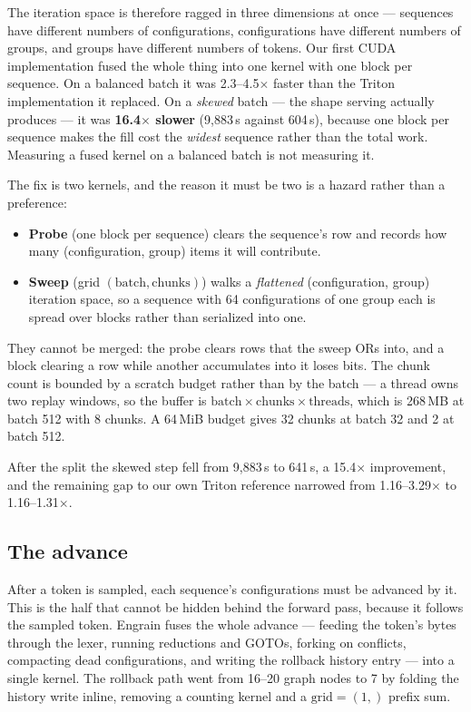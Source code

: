 \documentclass{article}
\begin{document}
The iteration space is therefore ragged in three dimensions at once ---
sequences have different numbers of configurations, configurations have
different numbers of groups, and groups have different numbers of tokens. Our
first CUDA implementation fused the whole thing into one kernel with one block
per sequence. On a balanced batch it was 2.3--4.5$\times$ faster than the Triton
implementation it replaced. On a \emph{skewed} batch --- the shape serving
actually produces --- it was \textbf{16.4$\times$ slower} (9{,}883\,\textmu{}s
against 604\,\textmu{}s), because one block per sequence makes the fill cost the
\emph{widest} sequence rather than the total work. Measuring a fused kernel on a
balanced batch is not measuring it.

The fix is two kernels, and the reason it must be two is a hazard rather than a
preference:

\begin{itemize}
\item \textbf{Probe} (one block per sequence) clears the sequence's row and
records how many (configuration, group) items it will contribute.
\item \textbf{Sweep} (grid $(\text{batch}, \text{chunks})$) walks a
\emph{flattened} (configuration, group) iteration space, so a sequence with 64
configurations of one group each is spread over blocks rather than serialized
into one.
\end{itemize}

They cannot be merged: the probe clears rows that the sweep ORs into, and a
block clearing a row while another accumulates into it loses bits. The chunk
count is bounded by a scratch budget rather than by the batch --- a thread owns
two replay windows, so the buffer is $\text{batch} \times \text{chunks} \times
\text{threads}$, which is 268\,MB at batch 512 with 8 chunks. A 64\,MiB budget
gives 32 chunks at batch 32 and 2 at batch 512.

After the split the skewed step fell from 9{,}883\,\textmu{}s to
641\,\textmu{}s, a 15.4$\times$ improvement, and the remaining gap to our own
Triton reference narrowed from 1.16--3.29$\times$ to 1.16--1.31$\times$.

\subsection{The advance}

After a token is sampled, each sequence's configurations must be advanced by it.
This is the half that cannot be hidden behind the forward pass, because it
follows the sampled token. Engrain fuses the whole advance --- feeding the
token's bytes through the lexer, running reductions and GOTOs, forking on
conflicts, compacting dead configurations, and writing the rollback history
entry --- into a single kernel. The rollback path went from 16--20 graph nodes
to 7 by folding the history write inline, removing a counting kernel and a
$\text{grid}=(1,)$ prefix sum.
\end{document}
